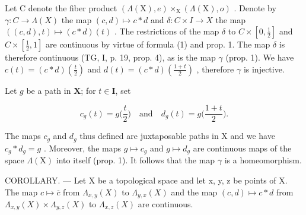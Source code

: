 Let C denote the fiber product \((\Lambda(\mathrm{X}),e)\times_{\mathrm{X}}(\Lambda(\mathrm{X}),o)\) . Denote by \(\gamma:C\to\Lambda(X)\) the map \((c,d)\mapsto c*d\) and \(\delta:C\times I\to X\) the map \(((c,d),t)\mapsto(c*d)(t)\) . The restrictions of the map \(\delta\) to \(C\times[0,\frac{1}{2}]\) and \(C\times[\frac{1}{2},1]\) are continuous by virtue of formula (1) and prop. 1. The map \(\delta\) is therefore continuous (TG, I, p. 19, prop. 4), as is the map \(\gamma\) (prop. 1). We have \(c(t)=(c*d)(\frac{t}{2})\) and \(d(t)=(c*d)(\frac{1+t}{2})\) , therefore \(\gamma\) is injective.

Let \(g\) be a path in \(\mathbf{X}\); for \(t \in \mathbf{I}\), set

\[
c _ {g} (t) = g \bigl (\frac {t}{2} \bigr) \quad \text{and} \quad d _ {g} (t) = g \bigl (\frac {1 + t}{2} \bigr).
\]

The maps \(c_{g}\) and \(d_{g}\) thus defined are juxtaposable paths in X and we have \(c_{g} * d_{g} = g\) . Moreover, the maps \(g \mapsto c_{g}\) and \(g \mapsto d_{g}\) are continuous maps of the space \(\Lambda(\mathrm{X})\) into itself (prop. 1). It follows that the map \(\gamma\) is a homeomorphism.

COROLLARY. --- Let X be a topological space and let x, y, z be points of X. The map \(c \mapsto \overline{c}\) from \(\Lambda_{x,y}(X)\) to \(\Lambda_{y,x}(X)\) and the map \((c,d) \mapsto c * d\) from \(\Lambda_{x,y}(X) \times \Lambda_{y,z}(X)\) to \(\Lambda_{x,z}(X)\) are continuous.

